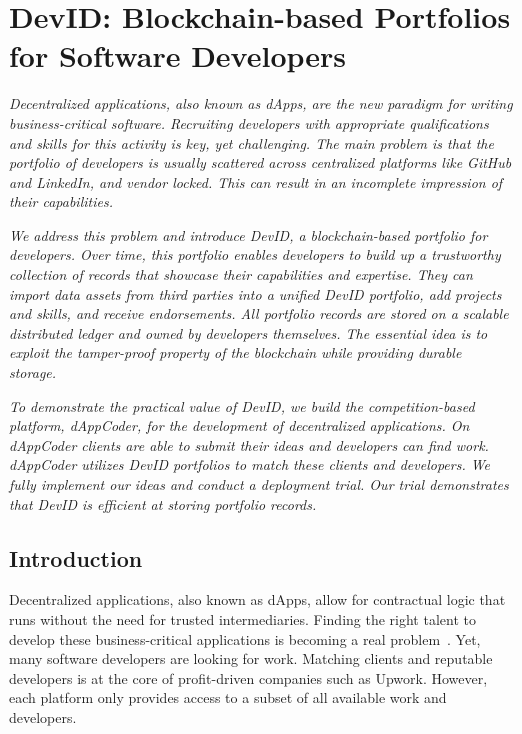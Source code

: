 \chapter{DevID: Blockchain-based Portfolios for Software Developers}
\label{chapter:devid}

\emph{Decentralized applications, also known as dApps, are the new paradigm for writing business-critical software.
Recruiting developers with appropriate qualifications and skills for this activity is key, yet challenging.
The main problem is that the portfolio of developers is usually scattered across centralized platforms like GitHub and LinkedIn, and vendor locked.
This can result in an incomplete impression of their capabilities. }

\emph{We address this problem and introduce \emph{DevID}, a blockchain-based portfolio for developers.
Over time, this portfolio enables developers to build up a trustworthy collection of records that showcase their capabilities and expertise.
They can import data assets from third parties into a unified DevID portfolio, add projects and skills, and receive endorsements.
All portfolio records are stored on a scalable distributed ledger and owned by developers themselves.
The essential idea is to exploit the tamper-proof property of the blockchain while providing durable storage.}

\emph{To demonstrate the practical value of DevID, we build the competition-based platform, \emph{dAppCoder}, for the development of decentralized applications.
On dAppCoder clients are able to submit their ideas and developers can find work.
dAppCoder utilizes DevID portfolios to match these clients and developers.
We fully implement our ideas and conduct a deployment trial.
Our trial demonstrates that DevID is efficient at storing portfolio records. }

\newpage

\section{Introduction}
\label{sec:introduction}
Decentralized applications, also known as dApps, allow for contractual logic that runs without the need for trusted intermediaries.
Finding the right talent to develop these business-critical applications is becoming a real problem~\cite{shortage2016nasdaq}.
Yet, many software developers are looking for work.
Matching clients and reputable developers is at the core of profit-driven companies such as Upwork.
However, each platform only provides access to a subset of all available work and developers.

